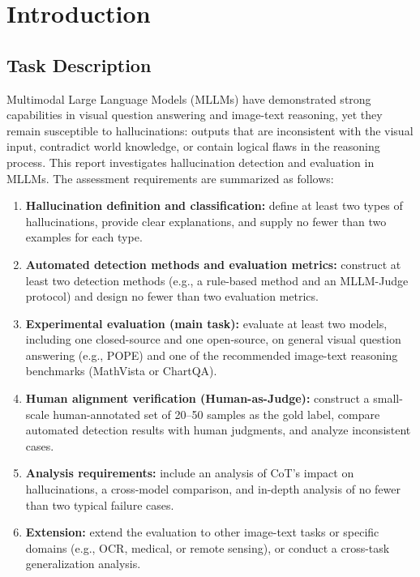 \section{Introduction}

\subsection{Task Description}

Multimodal Large Language Models (MLLMs) have demonstrated strong capabilities
in visual question answering and image-text reasoning,
yet they remain susceptible to hallucinations:
outputs that are inconsistent with the visual input,
contradict world knowledge,
or contain logical flaws in the reasoning process.
This report investigates hallucination detection and evaluation in MLLMs.
The assessment requirements are summarized as follows:

\begin{enumerate}
  \item \textbf{Hallucination definition and classification:}
    define at least two types of hallucinations,
    provide clear explanations,
    and supply no fewer than two examples for each type.
  \item \textbf{Automated detection methods and evaluation metrics:}
    construct at least two detection methods
    (e.g., a rule-based method and an MLLM-Judge protocol)
    and design no fewer than two evaluation metrics.
  \item \textbf{Experimental evaluation (main task):}
    evaluate at least two models,
    including one closed-source and one open-source,
    on general visual question answering (e.g., POPE)
    and one of the recommended image-text reasoning benchmarks
    (MathVista or ChartQA).
  \item \textbf{Human alignment verification (Human-as-Judge):}
    construct a small-scale human-annotated set
    of 20--50 samples as the gold label,
    compare automated detection results with human judgments,
    and analyze inconsistent cases.
  \item \textbf{Analysis requirements:}
    include an analysis of CoT's impact on hallucinations,
    a cross-model comparison,
    and in-depth analysis of no fewer than two typical failure cases.
  \item \textbf{Extension:}
    extend the evaluation to other image-text tasks
    or specific domains
    (e.g., OCR, medical, or remote sensing),
    or conduct a cross-task generalization analysis.
\end{enumerate}

